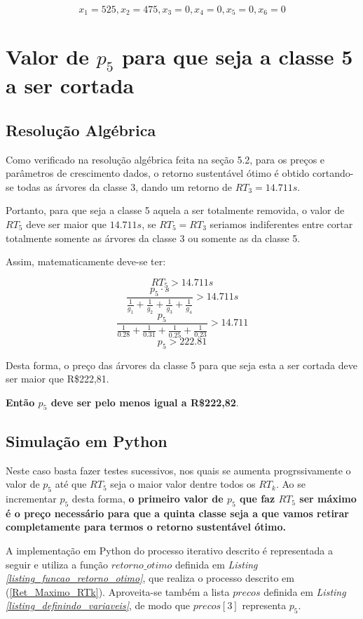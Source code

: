 \documentclass[a4paper, 12pt]{article}
\begin{document}
\begin{equation}\label{valores_de_xi}
    x_1 = 525, x_2=475, x_3=0, x_4=0, x_5=0, x_6=0
\end{equation}

\section{Valor de $p_5$ para que seja a classe 5 a ser cortada}
\subsection{Resolução Algébrica}

Como verificado na resolução algébrica feita na seção 5.2, para os preços e parâmetros de crescimento dados, o retorno sustentável ótimo é obtido cortando-se todas as árvores da classe 3, dando um retorno de $RT_3=14.711s$.

Portanto, para que seja a classe 5 aquela a ser totalmente removida, o valor de $RT_5$ deve ser maior que $14.711s$, se $RT_5=RT_3$ seriamos indiferentes entre cortar totalmente somente as árvores da classe 3 ou somente as da classe 5.

Assim, matematicamente deve-se ter:

$$RT_5>14.711s$$
$$\frac{p_5\cdot s}{\frac{1}{g_1}+\frac{1}{g_2}+\frac{1}{g_3}+\frac{1}{g_4}}>14.711s$$
$$\frac{p_5}{\frac{1}{0.28}+\frac{1}{0.31}+\frac{1}{0.25}+\frac{1}{0.23}}>14.711$$
$$p_5>222.81$$

Desta forma, o preço das árvores da classe 5 para que seja esta a ser cortada deve ser maior que R\$222,81.

\textbf{Então $p_5$ deve ser pelo menos igual a R\$222,82}.

\subsection{Simulação em Python}
Neste caso basta fazer testes sucessivos, nos quais se aumenta progrssivamente o valor de $p_5$ até que $RT_5$ seja o maior valor dentre todos os $RT_k$. Ao se incrementar $p_5$ desta forma, \textbf{o primeiro valor de $p_5$ que faz $RT_5$ ser máximo é o preço necessário para que a quinta classe seja a que vamos retirar completamente para termos o retorno sustentável ótimo.}

A implementação em Python do processo iterativo descrito é representada a seguir e utiliza a função $retorno\_otimo$ definida em \emph{Listing \ref{listing_funcao_retorno_otimo}}, que realiza o processo descrito em (\ref{Ret_Maximo_RTk}). Aproveita-se também a lista $precos$ definida em \emph{Listing \ref{listing_definindo_variaveis}}, de modo que $precos[3]$ representa $p_5$.
\end{document}
